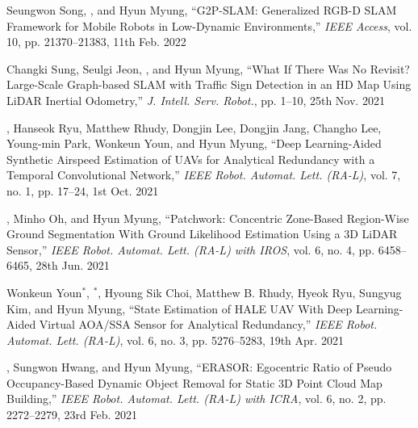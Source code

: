 \begin{pubSubsectionNum}
    \item Seungwon Song, \hyungtaelim, and Hyun Myung, ``G2P-SLAM: Generalized RGB-D SLAM Framework for Mobile Robots in Low-Dynamic Environments,'' \textit{IEEE Access}, vol. 10, pp. 21370--21383, 11th Feb. 2022
    \item Changki Sung, Seulgi Jeon, \hyungtaelim, and Hyun Myung, ``What If There Was No Revisit? Large-Scale Graph-based SLAM with Traffic Sign Detection in an HD Map Using LiDAR Inertial Odometry,'' \textit{J. Intell. Serv. Robot.}, pp. 1--10, 25th Nov. 2021
    \item \hyungtaelim, Hanseok Ryu, Matthew Rhudy, Dongjin Lee, Dongjin Jang, Changho Lee, Young-min Park, Wonkeun Youn, and Hyun Myung, ``Deep Learning-Aided Synthetic Airspeed Estimation of UAVs for Analytical Redundancy with a Temporal Convolutional Network,'' \textit{IEEE Robot. Automat. Lett. (RA-L)}, vol. 7, no. 1, pp. 17--24, 1st Oct. 2021
    \item \hyungtaelim, Minho Oh, and Hyun Myung, ``Patchwork: Concentric Zone-Based Region-Wise Ground Segmentation With Ground Likelihood Estimation Using a 3D LiDAR Sensor,'' \textit{IEEE Robot. Automat. Lett. (RA-L) with IROS}, vol. 6, no. 4, pp. 6458--6465, 28th Jun. 2021
    \item Wonkeun Youn$^{*}$, \hyungtaelim$^{*}$, Hyoung Sik Choi, Matthew B. Rhudy, Hyeok Ryu, Sungyug Kim, and Hyun Myung, ``State Estimation of HALE UAV With Deep Learning-Aided Virtual AOA/SSA Sensor for Analytical Redundancy,'' \textit{IEEE Robot. Automat. Lett. (RA-L)}, vol. 6, no. 3, pp. 5276--5283, 19th Apr. 2021
    \item \hyungtaelim, Sungwon Hwang, and Hyun Myung, ``ERASOR: Egocentric Ratio of Pseudo Occupancy-Based Dynamic Object Removal for Static 3D Point Cloud Map Building,'' \textit{IEEE Robot. Automat. Lett. (RA-L) with ICRA}, vol. 6, no. 2, pp. 2272--2279, 23rd Feb. 2021

\end{pubSubsectionNum}


